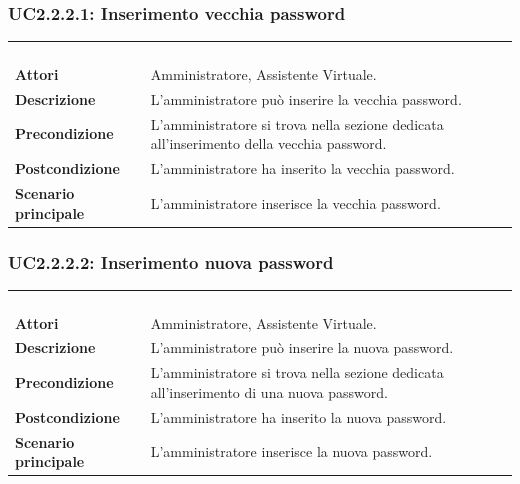 \subsubsection{UC2.2.2.1: Inserimento vecchia password}
\label{UC2.2.2.1}
\begin{longtable}{l|p{10cm}}
\rowcolor[gray]{0.8} \multicolumn{2}{c}{} \\
\rowcolor[gray]{0.8} \multicolumn{2}{c}{\textbf{UC2.2.2.1 - Inserimento vecchia password}} \\
\rowcolor[gray]{0.8} \multicolumn{2}{c}{} \\
\hline
&\\
\textbf{Attori} & Amministratore, Assistente Virtuale.\\[7pt]
\textbf{Descrizione} & L'amministratore può inserire la vecchia password.\\[7pt]
\textbf{Precondizione} & L'amministratore si trova nella sezione dedicata all'inserimento della vecchia password.\\[7pt]
\textbf{Postcondizione} & L'amministratore ha inserito la vecchia password.\\[7pt]
\textbf{Scenario principale} &L'amministratore inserisce la vecchia password.\\[7pt]\hline
\end{longtable}

\subsubsection{UC2.2.2.2: Inserimento nuova password}
\label{UC2.2.2.2}
\begin{longtable}{l|p{10cm}}
\rowcolor[gray]{0.8} \multicolumn{2}{c}{} \\
\rowcolor[gray]{0.8} \multicolumn{2}{c}{\textbf{UC2.2.2.2 - Inserimento nuova password}} \\
\rowcolor[gray]{0.8} \multicolumn{2}{c}{} \\
\hline
&\\
\textbf{Attori} & Amministratore, Assistente Virtuale.\\[7pt]
\textbf{Descrizione} & L'amministratore può inserire la nuova password.\\[7pt]
\textbf{Precondizione} & L'amministratore si trova nella sezione dedicata all'inserimento di una nuova password.\\[7pt]
\textbf{Postcondizione} & L'amministratore ha inserito la nuova password.\\[7pt]
\textbf{Scenario principale} &L'amministratore inserisce la nuova password.\\[7pt]\hline
\end{longtable}

